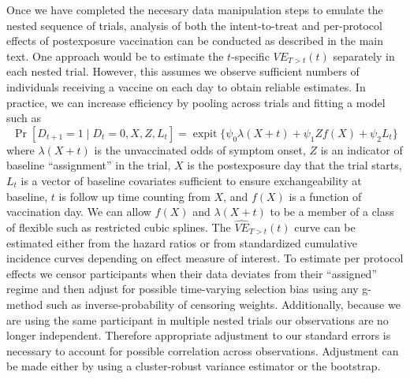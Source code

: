 \begin{appendix}
    Once we have completed the necesary data manipulation steps to emulate the nested sequence of trials, analysis of both the intent-to-treat and per-protocol effects of postexposure vaccination can be conducted as described in the main text. One approach would be to estimate the $t$-specific $VE_{T > t}(t)$ separately in each nested trial. However, this assumes we observe sufficient numbers of individuals receiving a vaccine on each day to obtain reliable estimates. In practice, we can increase efficiency by pooling across trials and fitting a model such as
    \begin{equation}\Pr[D_{t+1} = 1 \mid D_t = 0, X, Z, L_t] =  \operatorname{expit}\{\psi_0 \lambda(X + t) + \psi_1 Z f(X) + \psi_2 L_t\}
    \end{equation}\label{eqn:fixed}
    where $\lambda(X + t)$ is the unvaccinated odds of symptom onset,  $Z$ is an indicator of baseline ``assignment'' in the trial, $X$ is the postexposure day that the trial starts, $L_t$ is a vector of baseline covariates sufficient to ensure exchangeability at baseline, $t$ is follow up time counting from $X$, and $f(X)$ is a function of vaccination day. We can allow $f(X)$ and $\lambda(X + t)$ to be a member of a class of flexible such as restricted cubic splines. The $\widehat{VE}_{T > t}(t)$ curve can be estimated either from the hazard ratios or from standardized cumulative incidence curves depending on effect measure of interest. To estimate per protocol effects we censor participants when their data deviates from their ``assigned'' regime and then adjust for possible time-varying selection bias using any g-method such as inverse-probability of censoring weights. Additionally, because we are using the same participant in multiple nested trials our observations are no longer independent. Therefore appropriate adjustment to our standard errors is necessary to account for possible correlation across observations. Adjustment can be made either by using a cluster-robust variance estimator or the bootstrap. 


\end{appendix}
